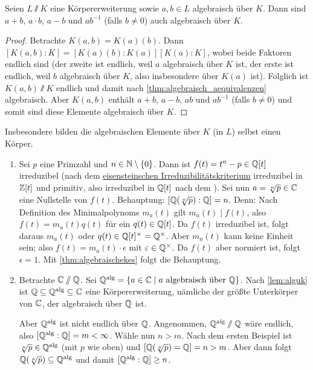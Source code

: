 \documentclass[12pt,a4paper]{scrartcl}
\begin{document}
\begin{lem}\label{lem:alguk}
	Seien $L\sslash K$ eine Körpererweiterung sowie $a,b\in L$ algebraisch über $K$. Dann sind $a+b$, $a\cdot b$, $a-b$ und $ab^{-1}$ (falls $b\neq 0$) auch algebraisch über $K$.
\end{lem}
\begin{proof}
	Betrachte $K(a,b) = K(a)(b)$. Dann $[K(a,b):K] = [K(a)(b):K(a)][K(a):K]$, wobei beide Faktoren endlich sind (der zweite ist endlich, weil $a$ algebraisch über $K$ ist, der erste ist endlich, weil $b$ algebraisch über $K$, also insbesondere über $K(a)$ ist). Folglich ist $K(a,b)\sslash K$ endlich und damit nach \cref{thm:algebraisch_aequivalenzen} algebraisch. Aber $K(a,b)$ enthält $a+b$, $a-b$, $ab$ und $ab^{-1}$ (falls $b\neq 0$) und somit sind diese Elemente algebraisch über $K$.
\end{proof}

\begin{bem}
	Insbesondere bilden die algebraischen Elemente über $K$ (in $L$) selbst einen Körper.
\end{bem}
	
\begin{bsp}
	\leavevmode
	\begin{enumerate}
	\item Sei $p$ eine Primzahl und $n \in\mathbb N\setminus\{0\}$. Dann ist $f(t) = t^n-p\in \mathbb Q[t]$ irreduzibel (nach dem \hyperref[thm:eisenstein]{eisensteinschen Irreduzibilitätskriterium} irreduzibel in $\mathbb Z[t]$ und primitiv, also irreduzibel in $\mathbb Q[t]$ nach dem ).
	Sei nun $a = \sqrt[n]{p}\in\mathbb C$ eine Nullstelle von $f(t)$. Behauptung: $[\mathbb Q(\sqrt[n]{p}): \mathbb Q] = n$. Denn: Nach Definition des Minimalpolynoms $m_a(t)$ gilt $m_a(t)\mid f(t)$, also $f(t) = m_a(t)q(t)$ für ein $q(t)\in\mathbb Q[t]$. Da $f(t)$ irreduzibel ist, folgt daraus $m_a(t)$ oder $q(t)\in \mathbb Q[t]^{\times} = \mathbb Q^{\times}$. Aber $m_a(t)$ kann keine Einheit sein; also $f(t) = m_a(t)\cdot \epsilon$ mit $\varepsilon\in \mathbb Q^{\times}$. Da $f(t)$ aber normiert ist, folgt $\epsilon = 1$. Mit \cref{thm:algebraischekes} folgt die Behauptung.
	\item\label{enumi:IQalgkoerp} Betrachte $\mathbb C\sslash \mathbb Q$. Sei $\mathbb Q^{\text{alg}} = \{a\in\mathbb C\mid a\text{ algebraisch über }\mathbb Q\}$. Nach \cref{lem:alguk} ist $\mathbb Q\subseteq\mathbb Q^{\text{alg}}\subseteq \mathbb C$ eine Körpererweiterung, nämliche der größte Unterkörper von $\mathbb C$, der algebraisch über $\mathbb Q$ ist.
	
	Aber $\mathbb Q^{\text{alg}}$ ist nicht endlich über $\mathbb Q$. Angenommen, $\mathbb Q^{\text{alg}}\sslash \mathbb Q$ wäre endlich, also $[\mathbb Q^{\text{alg}}:\mathbb Q] = m<\infty$. Wähle nun $n>m$. Nach dem ersten Beispiel ist $\sqrt[n]p \in \mathbb Q^{\text{alg}}$ (mit $p$ wie oben) und $[\mathbb Q(\sqrt[n]p) = \mathbb Q] = n > m$. Aber dann folgt $\mathbb Q(\sqrt[n]p)\subseteq \mathbb Q^{\text{alg}}$ und damit $[\mathbb Q^{\text{alg}}:\mathbb Q]\geq n$.
	\end{enumerate}
\end{bsp}
\end{document}
